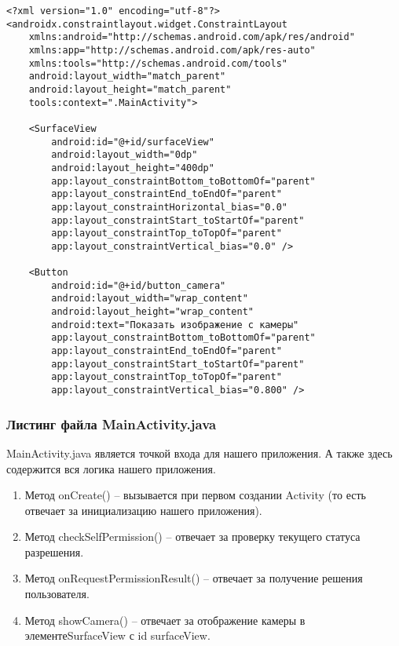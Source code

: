 \begin{verbatim}
<?xml version="1.0" encoding="utf-8"?>
<androidx.constraintlayout.widget.ConstraintLayout
    xmlns:android="http://schemas.android.com/apk/res/android"
    xmlns:app="http://schemas.android.com/apk/res-auto"
    xmlns:tools="http://schemas.android.com/tools"
    android:layout_width="match_parent"
    android:layout_height="match_parent"
    tools:context=".MainActivity">

    <SurfaceView
        android:id="@+id/surfaceView"
        android:layout_width="0dp"
        android:layout_height="400dp"
        app:layout_constraintBottom_toBottomOf="parent"
        app:layout_constraintEnd_toEndOf="parent"
        app:layout_constraintHorizontal_bias="0.0"
        app:layout_constraintStart_toStartOf="parent"
        app:layout_constraintTop_toTopOf="parent"
        app:layout_constraintVertical_bias="0.0" />

    <Button
        android:id="@+id/button_camera"
        android:layout_width="wrap_content"
        android:layout_height="wrap_content"
        android:text="Показать изображение с камеры"
        app:layout_constraintBottom_toBottomOf="parent"
        app:layout_constraintEnd_toEndOf="parent"
        app:layout_constraintStart_toStartOf="parent"
        app:layout_constraintTop_toTopOf="parent"
        app:layout_constraintVertical_bias="0.800" />
\end{verbatim}


\subsubsection{Листинг файла MainActivity.java}

MainActivity.java является точкой входа для нашего приложения. А также здесь содержится вся логика нашего приложения.
\begin{enumerate}
\item Метод onCreate() – вызывается при первом создании Activity (то есть отвечает за инициализацию нашего приложения).
\item Метод checkSelfPermission() – отвечает за проверку текущего статуса разрешения.
\item Метод onRequestPermissionResult() – отвечает за получение решения пользователя.
\item Метод showCamera() – отвечает за отображение камеры в элементе\newline SurfaceView с id surfaceView.
\end{enumerate}


